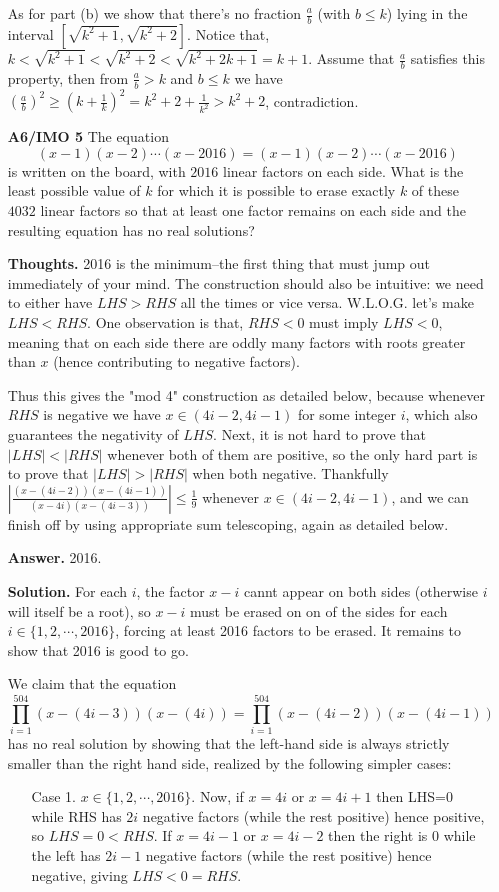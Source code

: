 \documentclass[11pt,a4paper]{article}
\begin{document}
\begin{itemize}
As for part (b) we show that there's no fraction $\frac ab$ (with $b\le k$) lying in the interval $[\sqrt{k^2+1}, \sqrt{k^2+2}]$. 
Notice that, $k< \sqrt{k^2+1} < \sqrt{k^2+2} < \sqrt{k^2+2k+1} =k+1$. 
Assume that $\frac ab$ satisfies this property, 
then from $\frac ab > k$ and $b\le k$ we have 
$(\frac ab)^2\ge (k+\frac 1k)^2=k^2+2+\frac 1{k^2} > k^2+2$, contradiction. 

\newpage
\item[\textbf{A6/IMO 5}]
The equation
$$(x-1)(x-2)\cdots(x-2016)=(x-1)(x-2)\cdots (x-2016)$$is written on the board, with $2016$ linear factors on each side. What is the least possible value of $k$ for which it is possible to erase exactly $k$ of these $4032$ linear factors so that at least one factor remains on each side and the resulting equation has no real solutions?

\textbf{Thoughts.} 2016 is the minimum--the first thing that must jump out immediately of your mind. 
The construction should also be intuitive: we need to either have $LHS>RHS$ all the times or vice versa. 
W.L.O.G. let's make $LHS<RHS$. One observation is that, $RHS<0$ must imply $LHS<0$, meaning that on each side there are oddly many factors with roots greater than $x$ (hence contributing to negative factors). 

Thus this gives the "mod 4" construction as detailed below, because whenever $RHS$ is negative we have $x\in (4i-2, 4i-1)$ for some integer $i$, which also guarantees the negativity of $LHS$. 
Next, it is not hard to prove that $|LHS|<|RHS|$ whenever both of them are positive, 
so the only hard part is to prove that $|LHS|>|RHS|$ when both negative. 
Thankfully $|\frac{(x-(4i-2))(x-(4i-1))}{(x-4i)(x-(4i-3))}|\le \frac 19$ whenever $x\in (4i-2, 4i-1)$, and we can finish off by using appropriate sum telescoping, again as detailed below. 

\textbf{Answer.} 2016.

\textbf{Solution.}  
For each $i$, the factor $x-i$ cannt appear on both sides (otherwise $i$ will itself be a root), 
so $x-i$ must be erased on on of the sides for each $i\in \{1, 2, \cdots , 2016\}$, forcing at least 2016 factors to be erased. 
It remains to show that 2016 is good to go. 

We claim that the equation 
$$\displaystyle\prod_{i=1}^{504} (x-(4i-3))(x-(4i))=\displaystyle\prod_{i=1}^{504} (x-(4i-2))(x-(4i-1))$$ 
has no real solution by showing that the left-hand side is always strictly smaller than the right hand side, realized by the following simpler cases: 
\begin{itemize}
\item [Case 1.] 
$x\in\{1,2,\cdots ,2016\}$. 
Now, if $x=4i$ or $x=4i+1$ then LHS=0 while RHS has $2i$ negative factors (while the rest positive) hence positive, 
so $LHS=0<RHS$. 
If $x=4i-1$ or $x=4i-2$ then the right is 0 while the left has $2i-1$ negative factors (while the rest positive) hence negative, 
giving $LHS<0=RHS$. 


\end{itemize}
\end{itemize}
\end{document}
